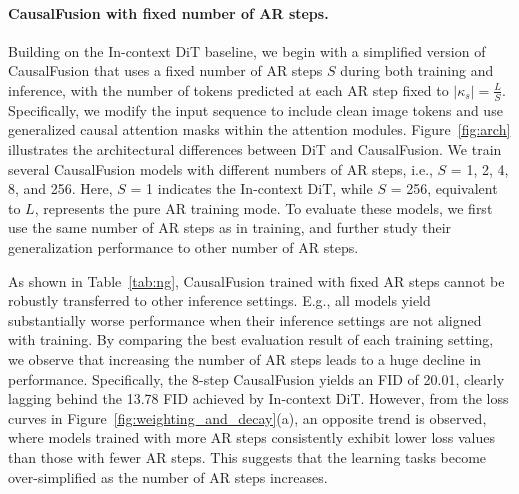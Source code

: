 \vspace{-5pt}
\paragraph{CausalFusion with fixed number of AR steps.} Building on the In-context DiT baseline, we begin with a simplified version of CausalFusion that uses a fixed number of AR steps $S$ during both training and inference, with the number of tokens predicted at each AR step fixed to $|\kappa_s| = \frac{L}{S}$. Specifically, we modify the input sequence to include clean image tokens and use generalized causal attention masks within the attention modules. Figure~\ref{fig:arch} illustrates the architectural differences between DiT and CausalFusion.
We train several CausalFusion models with different numbers of AR steps, i.e., $S$ = 1, 2, 4, 8, and 256. Here, $S$ = 1 indicates the In-context DiT, while $S$ = 256, equivalent to $L$, represents the pure AR training mode. To evaluate these models, we first use the same number of AR steps as in training, and further study their generalization performance to other number of AR steps. 

As shown in Table~\ref{tab:ng}, CausalFusion trained with fixed AR steps cannot be robustly transferred to other inference settings. E.g., all models yield substantially worse performance when their inference settings are not aligned with training. By comparing the best evaluation result of each training setting, we observe that increasing the number of AR steps leads to a huge decline in performance. Specifically, the 8-step CausalFusion yields an FID of 20.01, clearly lagging behind the 13.78 FID achieved by In-context DiT. However, from the loss curves in Figure~\ref{fig:weighting_and_decay}(a), an opposite trend is observed, where models trained with more AR steps consistently exhibit lower loss values than those with fewer AR steps. This suggests that the learning tasks become over-simplified as the number of AR steps increases.

\vspace{-5pt}
